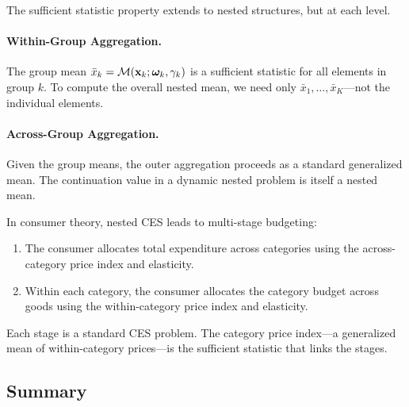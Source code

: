 The sufficient statistic property extends to nested structures, but at each level.

\paragraph{Within-Group Aggregation.}
The group mean $\bar{x}_k = \mathcal{M}(\mathbf{x}_k; \boldsymbol{\omega}_k, \gamma_k)$ is a sufficient statistic for all elements in group $k$. To compute the overall nested mean, we need only $\bar{x}_1, \ldots, \bar{x}_K$---not the individual elements.

\paragraph{Across-Group Aggregation.}
Given the group means, the outer aggregation proceeds as a standard generalized mean. The continuation value in a dynamic nested problem is itself a nested mean.

\begin{calloutnote}
In consumer theory, nested CES leads to multi-stage budgeting:
\begin{enumerate}[leftmargin=1.5em]
    \item The consumer allocates total expenditure across categories using the across-category price index and elasticity.
    \item Within each category, the consumer allocates the category budget across goods using the within-category price index and elasticity.
\end{enumerate}
Each stage is a standard CES problem. The category price index---a generalized mean of within-category prices---is the sufficient statistic that links the stages.
\end{calloutnote}

\subsection{Summary}
\label{subsec:nested-summary}

